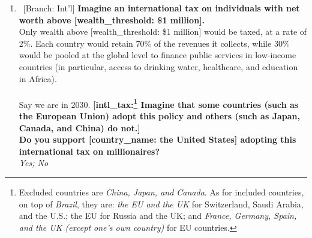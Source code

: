 \documentclass[12pt,english]{article}
\begin{document}
\begin{bibunit}
\begin{enumerate}[resume]
\item ~[Branch: Int'l] \label{q:intl_tax_support} \textbf{Imagine an international tax on individuals with net worth above [wealth\_threshold: \$1 million].~}\\Only wealth above [wealth\_threshold: \$1 million] would be taxed, at a rate of 2\%. Each country would retain 70\% of the revenues it collects, while 30\% would be pooled at the global level to finance public services in low-income countries (in particular, access to drinking water, healthcare, and education in Africa). \\\\Say we are in 2030.\textbf{ [intl\_tax:\footnote{Excluded countries are \textit{China, Japan, and Canada}. As for included countries, on top of \textit{Brazil}, they are: \textit{the EU and the UK} for Switzerland, Saudi Arabia, and the U.S.; the EU\textit{} for Russia and the UK; and \textit{France, Germany, Spain, and the UK (except one's own country)} for EU countries.} Imagine that some countries  (such as the European Union) adopt this policy and others (such as Japan, Canada, and China) do not.]\\Do you support [country\_name: the United States] adopting this international tax on millionaires?}
  \\ \textit{Yes; No}

\end{enumerate} 


\end{bibunit}
\end{document}
